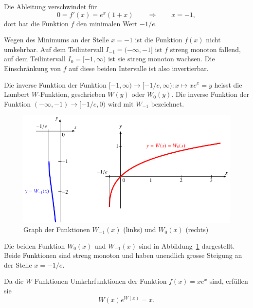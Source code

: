 Die Ableitung verschwindet für
\[
0 = f'(x) = e^x(1+x)
\qquad\Rightarrow\qquad
x=-1,
\]
dort hat die Funktion $f$ den minimalen Wert $-1/e$.

Wegen des Minimums an der Stelle $x=-1$ ist die Funktion $f(x)$ nicht
umkehrbar.
Auf dem Teilintervall $I_{-1}=(-\infty,-1]$ ist $f$ streng
monoton fallend, auf dem Teilintervall $I_0=[-1,\infty)$ ist sie
streng monoton wachsen.
Die Einschränkung von $f$ auf diese beiden Intervalle ist also
invertierbar.

\begin{definition}
Die inverse Funktion der Funktion $[-1,\infty)\to[-1/e,\infty):x\mapsto xe^x=y$
heisst die Lambert $W$-Funktion, geschrieben $W(y)$ oder $W_0(y)$.
%
Die inverse Funktion der Funktion $(-\infty,-1)\to[-1/e,0)$ wird mit
$W_{-1}$ bezeichnet.
%
\end{definition}

\begin{figure}
\centering
\includegraphics{chapters/020-exponential/images/w.pdf}
\caption{Graph der Funktionen $W_{-1}(x)$ (links) und $W_0(x)$ (rechts)
\label{buch:lambert:wgraph}}
\end{figure}
Die beiden Funktion $W_0(x)$ und $W_{-1}(x)$ sind in
Abbildung~\ref{buch:lambert:wgraph} dargestellt.
Beide Funktionen sind streng monoton und haben unendlich grosse Steigung
an der Stelle $x=-1/e$.

Da die $W$-Funktionen Umkehrfunktionen der Funktion $f(x)=xe^x$ sind,
erfüllen sie
\[
W(x) e^{W(x)} = x.
\]

%
%
